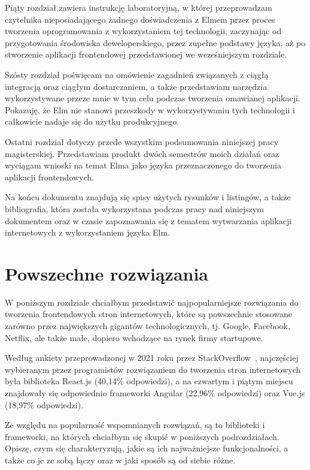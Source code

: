 \documentclass[twoside,a4paper]{report}
\begin{document}
Piąty rozdział zawiera instrukcję laboratoryjną, w której przeprowadzam czytelnika nieposiadającego żadnego doświadczenia z Elmem przez proces tworzenia oprogramowania z wykorzystaniem tej technologii, zaczynając od przygotowania środowiska deweloperskiego, przez zupełne podstawy języka, aż po stworzenie aplikacji frontendowej przedstawionej we wcześniejszym rozdziale.

Szósty rozdział poświęcam na omówienie zagadnień związanych z ciągłą integracją oraz ciągłym dostarczaniem, a także przedstawiam narzędzia wykorzystywane przeze mnie w tym celu podczas tworzenia omawianej aplikacji.
Pokazuję, że Elm nie stanowi przeszkody w wykorzystywaniu tych technologii i całkowicie nadaje się do użytku produkcyjnego.

Ostatni rozdział dotyczy przede wszystkim podsumowania niniejszej pracy magisterskiej.
Przedstawiam produkt dwóch semestrów moich działań oraz wyciągam wnioski na temat Elma jako języka przeznaczonego do tworzenia aplikacji frontendowych.

Na końcu dokumentu znajdują się spisy użytych rysunków i listingów, a także bibliografia, która została wykorzystana podczas pracy nad niniejszym dokumentem oraz w czasie zapoznawania się z tematem wytwarzania aplikacji internetowych z wykorzystaniem języka Elm.


\chapter{Powszechne rozwiązania}
W poniższym rozdziale chciałbym przedstawić najpopularniejsze rozwiązania do tworzenia frontendowych stron internetowych, które są powszechnie stosowane zarówno przez największych gigantów technologicznych, tj. Google, Facebook, Netflix, ale także małe, dopiero wchodzące na rynek firmy startupowe.

Według ankiety przeprowadzonej w 2021 roku przez StackOverflow~\cite{stacksurvey}, najczęściej wybieranym przez programistów rozwiązaniem do tworzenia stron internetowych była biblioteka React.js (40,14\% odpowiedzi), a na czwartym i piątym miejscu znajdowały się odpowiednio frameworki Angular (22,96\% odpowiedzi) oraz Vue.js (18,97\% odpowiedzi).

Ze względu na popularność wspomnianych rozwiązań, są to biblioteki i frameworki, na których chciałbym się skupić w poniższych podrozdziałach.
Opiszę, czym się charakteryzują, jakie są ich najważniejsze funkcjonalności, a także co je ze sobą łączy oraz w jaki sposób są od siebie różne.
\end{document}
